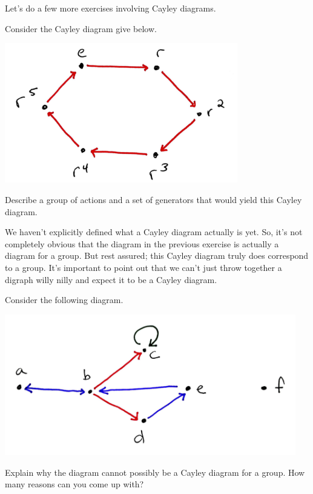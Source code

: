 Let's do a few more exercises involving Cayley diagrams.

\begin{exercise}
Consider the Cayley diagram give below.
\begin{center}
\includegraphics[width=4in]{rotation6.png}
\end{center}
Describe a group of actions and a set of generators that would yield this Cayley diagram.
\end{exercise}

We haven't explicitly defined what a Cayley diagram actually is yet.  So, it's not completely obvious that the diagram in the previous exercise is actually a diagram for a group.  But rest assured; this Cayley diagram truly does correspond to a group.  It's important to point out that we can't just throw together a digraph willy nilly and expect it to be a Cayley diagram.

\begin{exercise}
Consider the following diagram.
\begin{center}
\includegraphics[width=5in]{nonCayley.png}
\end{center}
Explain why the diagram cannot possibly be a Cayley diagram for a group.  How many reasons can you come up with?
\end{exercise}


